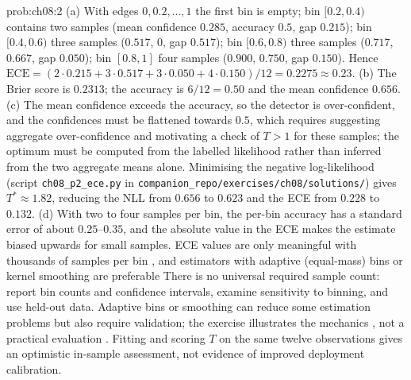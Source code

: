 \documentclass[graybox,envcountchap]{style/SNmono}
\newcommand{\repopath}[1]{\texttt{#1}}
\providecommand{\DIFadd}[1]{{\protect\color{blue} #1}} %
\providecommand{\DIFdel}[1]{{\protect\color{red} #1}} %
\providecommand{\DIFaddbegin}{} %
\providecommand{\DIFaddend}{} %
\providecommand{\DIFdelbegin}{} %
\providecommand{\DIFdelend}{} %
\begin{document}
\begin{sol}{prob:ch08:2}
(a) With edges $0,0.2,\dots,1$ the first bin is empty; bin $[0.2,0.4)$ contains two samples (mean confidence $0.285$, accuracy $0.5$, gap $0.215$); bin $[0.4,0.6)$ three samples ($0.517$, $0$, gap $0.517$); bin $[0.6,0.8)$ three samples ($0.717$, $0.667$, gap $0.050$); bin $[0.8,1]$ four samples ($0.900$, $0.750$, gap $0.150$). Hence $\mathrm{ECE}=(2\cdot0.215+3\cdot0.517+3\cdot0.050+4\cdot0.150)/12=0.2275\approx0.23$. (b) The Brier score is $0.2313$; the accuracy is $6/12=0.50$ and the mean confidence $0.656$. (c) The mean confidence exceeds the accuracy, \DIFdelbegin \DIFdel{so the detector is over-confident, and the confidences must be flattened towards $0.5$, which requires }\DIFdelend \DIFaddbegin \DIFadd{suggesting aggregate over-confidence and motivating a check of }\DIFaddend $T>1$ \DIFaddbegin \DIFadd{for these samples; the optimum must be computed from the labelled likelihood rather than inferred from the two aggregate means alone}\DIFaddend . Minimising the negative log-likelihood (script \repopath{ch08\_\allowbreak p2\_\allowbreak ece.py} in \repopath{companion\_\allowbreak repo/\allowbreak exercises/\allowbreak ch08/\allowbreak solutions/\allowbreak }) gives $T^\ast\approx1.82$, reducing the NLL from $0.656$ to $0.623$ and the ECE from $0.228$ to $0.132$. (d) With two to four samples per bin, the per-bin accuracy has a standard error of about $0.25$--$0.35$, and the absolute value in the ECE makes the estimate biased upwards for small samples. \DIFdelbegin \DIFdel{ECE values are only meaningful with thousands of samples per bin , and estimators with adaptive (equal-mass) bins or kernel smoothing are preferable}\DIFdelend \DIFaddbegin \DIFadd{There is no universal required sample count: report bin counts and confidence intervals, examine sensitivity to binning, and use held-out data. Adaptive bins or smoothing can reduce some estimation problems but also require validation}\DIFaddend ; the exercise illustrates the mechanics\DIFdelbegin \DIFdel{, not a practical evaluation}\DIFdelend \DIFaddbegin \DIFadd{. Fitting and scoring $T$ on the same twelve observations gives an optimistic in-sample assessment, not evidence of improved deployment calibration}\DIFaddend .
\end{sol}
\end{document}
